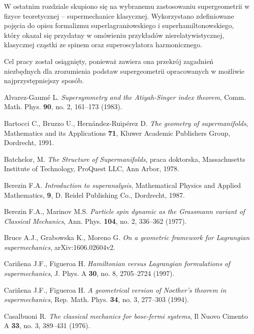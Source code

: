 \documentclass[11pt,a4paper]{report}
\theoremstyle{definition}
\begin{document}
W ostatnim rozdziale skupiono się na wybranemu zastosowaniu supergeometrii w fizyce teoretycznej -- supermechanice klasycznej. Wykorzystano zdefiniowane pojęcia do opisu formalizmu superlagranżowskiego i superhamiltonowskiego, który okazał się przydatny w omówieniu przykładów nierelatywistycznej, klasycznej cząstki ze spinem oraz superoscylatora harmonicznego.

Cel pracy został osiągnięty, ponieważ zawiera ona przekrój zagadnień niezbędnych dla zrozumienia podstaw supergeometrii opracowanych w możliwie najprzystępniejszy sposób.

\newpage

\begin{thebibliography}{}

Alvarez-Gaumé L. \textit{Supersymmetry and the Atiyah-Singer index theorem}, Comm. Math. Phys. {\bf 90}, no. 2, 161--173 (1983).

Bartocci C., Bruzzo U., Hernández-Ruipérez D. \textsl{The geometry of supermanifolds}, Mathematics and its Applications {\bf 71}, Kluwer Academic Publishers Group, Dordrecht, 1991.

Batchelor, M. \textsl{The Structure of Supermanifolds}, praca doktorska, Massachusetts Institute of Technology, ProQuest LLC, Ann Arbor, 1978.

Berezin F.A. \textsl{Introduction to superanalysis}, Mathematical Physics and Applied Mathematics, {\bf 9}, D. Reidel Publishing Co., Dordrecht, 1987.

Berezin F.A., Marinov M.S. {\it Particle spin dynamic as the Grassmann variant of Classical Mechanics}, Ann. Phys. {\bf 104}, no. 2, 336--362 (1977).

Bruce A.J., Grabowska K., Moreno G.
{\it On a geometric framework for Lagrangian supermechanics},
arXiv:1606.02604v2.

Cariñena J.F., Figueroa H. \textit{Hamiltonian versus Lagrangian formulations of supermechanics}, J. Phys. A {\bf 30}, no. 8, 2705--2724 (1997).

Cari\~nena J.F., Figueroa H. \textit{A geometrical version of Noether's theorem in supermechanics}, Rep. Math. Phys. {\bf 34}, no. 3, 277--303 (1994).

Casalbuoni R. \textit{The classical mechanics for bose-fermi systems}, Il Nuovo Cimento A {\bf 33}, no. 3, 389--431 (1976).


\end{thebibliography}
\end{document}
